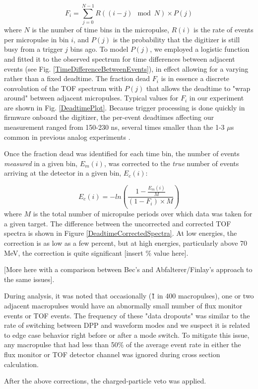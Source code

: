 \documentclass[twocolumn,secnumarabic,amssymb, nobibnotes, aps, prl,
superscriptaddress, nobalancelastpage]{revtex4}
\begin{document}
$$
F_{i} = \sum_{j=0}^{N-1} R((i-j)\mod N) \times P(j)
$$
where $N$ is the number of time bins in the micropulse, $R(i)$ is the
rate of events per micropulse in bin $i$, and $P(j)$ is the probability that
the digitizer is still busy from a trigger $j$ bins ago.
To model $P(j)$, we employed a logistic function and fitted it to the observed
spectrum for time differences between adjacent events (see Fig.
\ref{TimeDifferenceBetweenEvents}), in effect allowing for a varying
rather than a fixed deadtime.
The fraction dead $F_{i}$ is in essence a discrete convolution of the TOF spectrum 
with $P(j)$ that allows the deadtime to "wrap around" between adjacent micropulses. 
Typical values for $F_{i}$ in our experiment are shown in Fig.
\ref{DeadtimePlot}. Because trigger processing is done quickly in firmware onboard the
digitizer, the per-event deadtimes affecting our measurement ranged from 150-230
ns, several times smaller than the 1-3 $\mu$s common in previous analog
experiments \cite{Finlay1993, Abfalterer2001}.

Once the fraction dead was identified for each time bin, the number of events
\textit{measured} in a given bin, $E_{m}(i)$, was corrected to the \textit{true} number
of events arriving at the detector in a given bin, $E_{c}(i)$:

$$
E_{c}(i) = -ln\left(\frac{1-\frac{E_{m}(i)}{M}}{(1-F_{i})\times M}\right)
$$
where $M$ is the total number of micropulse periods over which data was taken for a
given target. The difference between the uncorrected and corrected TOF spectra 
is shown in Figure \ref{DeadtimeCorrectedSpectra}. At low energies, the
correction is as low as a few percent, but at high energies, particularly above
70 MeV, the correction is quite significant [insert \% value here].

[More here with a comparison between Bec's and Abfalterer/Finlay's approach to
the same issues].

During analysis, it was noted that occasionally (\~1 in 400 macropulses), one or two 
adjacent macropulses would have an abnormally small number of flux monitor events or 
TOF events. The frequency of these "data dropouts" was similar to the rate of
switching between DPP and waveform modes and we suspect it is related to edge
case behavior right before or after a mode switch. To mitigate this issue,
any macropulse that had less than 50\% of the average event rate in either the
flux monitor or TOF detector channel was ignored during cross section calculation.

After the above corrections, the charged-particle veto was applied. 
\end{document}
